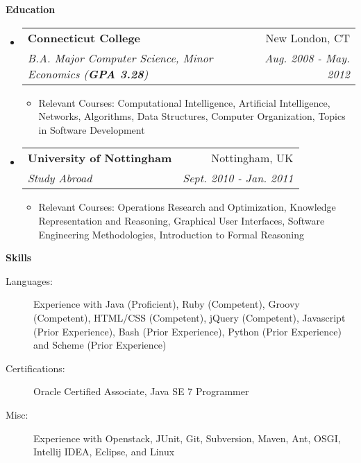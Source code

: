 \documentclass[letterpaper,11pt]{article}
\makeatletter
\newcommand{\resitem}[1]{\item #1 \vspace{-2pt}}
\newcommand{\resheading}[1]{{\large \colorbox{mygrey}{\begin{minipage}{\textwidth}{\textbf{#1 \vphantom{p\^{E}}}}\end{minipage}}}}
\newcommand{\ressubheading}[4]{
\begin{tabular*}{7.0in}{l@{\extracolsep{\fill}}r}
		\textbf{#1} & #2 \\
		\textit{#3} & \textit{#4} \\
\end{tabular*}\vspace{-6pt}}
\makeatother
\begin{document}
\resheading{Education}
\begin{itemize}
	\item
	\ressubheading{Connecticut College}{New London, CT}{B.A. Major Computer Science, Minor Economics (\textbf{GPA 3.28})}{Aug. 2008 - May. 2012}
	\begin{itemize}
		\resitem{Relevant Courses: Computational Intelligence, Artificial Intelligence, Networks, Algorithms, Data Structures, Computer Organization, Topics in Software Development}
	\end{itemize}
	
	\item
	\ressubheading{University of Nottingham}{Nottingham, UK}{Study Abroad}{Sept. 2010 - Jan. 2011}
	\begin{itemize}
		\resitem{Relevant Courses: Operations Research and Optimization, Knowledge Representation and Reasoning, Graphical User Interfaces, Software Engineering Methodologies, Introduction to Formal Reasoning}
	\end{itemize}
\end{itemize}

\resheading{Skills}
\begin{description}
	\item[Languages:]
		Experience with Java (Proficient), Ruby (Competent), Groovy (Competent), HTML/CSS (Competent), jQuery (Competent), Javascript (Prior Experience), Bash (Prior Experience), Python (Prior Experience) and Scheme (Prior Experience)
	\item[Certifications:]
		Oracle Certified Associate, Java SE 7 Programmer
	\item[Misc:]
		Experience with Openstack, JUnit, Git, Subversion, Maven, Ant, OSGI, Intellij IDEA, Eclipse, and Linux
\end{description}
\end{document}
